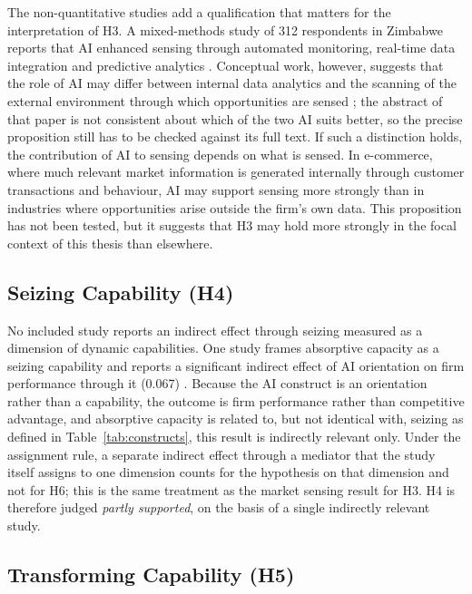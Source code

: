 The non-quantitative studies add a qualification that matters for the interpretation of H3. A mixed-methods study of 312 respondents in Zimbabwe reports that AI enhanced sensing through automated monitoring, real-time data integration and predictive analytics \parencite{maune2026}. Conceptual work, however, suggests that the role of AI may differ between internal data analytics and the scanning of the external environment through which opportunities are sensed \parencite{siaw2024}; the abstract of that paper is not consistent about which of the two AI suits better, so the precise proposition still has to be checked against its full text. If such a distinction holds, the contribution of AI to sensing depends on what is sensed. In e-commerce, where much relevant market information is generated internally through customer transactions and behaviour, AI may support sensing more strongly than in industries where opportunities arise outside the firm's own data. This proposition has not been tested, but it suggests that H3 may hold more strongly in the focal context of this thesis than elsewhere.

\subsection{Seizing Capability (H4)}
\label{sec:h4}

No included study reports an indirect effect through seizing measured as a dimension of dynamic capabilities. One study frames absorptive capacity as a seizing capability and reports a significant indirect effect of AI orientation on firm performance through it (0.067) \parencite{li2026}. Because the AI construct is an orientation rather than a capability, the outcome is firm performance rather than competitive advantage, and absorptive capacity is related to, but not identical with, seizing as defined in Table~\ref{tab:constructs}, this result is indirectly relevant only. Under the assignment rule, a separate indirect effect through a mediator that the study itself assigns to one dimension counts for the hypothesis on that dimension and not for H6; this is the same treatment as the market sensing result for H3. H4 is therefore judged \textit{partly supported}, on the basis of a single indirectly relevant study.

\subsection{Transforming Capability (H5)}
\label{sec:h5}

